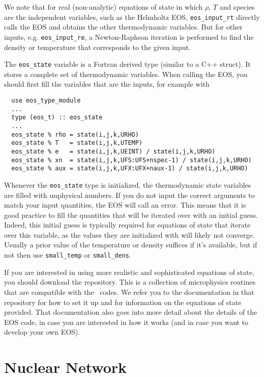We note that for real (non-analytic) equations of state
in which $\rho$, $T$ and species are the independent variables, such
as the Helmholtz EOS, {\tt eos\_input\_rt} directly calls the EOS
and obtains the other thermodynamic variables. But for other inputs,
e.g. {\tt eos\_input\_re}, a Newton-Raphson iteration is performed
to find the density or temperature that corresponds to the given
input.

The {\tt eos\_state} variable is a Fortran derived type (similar to
a C++ struct). It stores a complete set of thermodynamic
variables. When calling the EOS, you should first fill the variables
that are the inputs, for example with
\begin{verbatim}
  use eos_type_module
  ...
  type (eos_t) :: eos_state
  ...
  eos_state % rho = state(i,j,k,URHO)
  eos_state % T   = state(i,j,k,UTEMP)
  eos_state % e   = state(i,j,k,UEINT) / state(i,j,k,URHO)
  eos_state % xn  = state(i,j,k,UFS:UFS+nspec-1) / state(i,j,k,URHO)
  eos_state % aux = state(i,j,k,UFX:UFX+naux-1) / state(i,j,k,URHO)
\end{verbatim}
Whenever the \texttt{eos\_state} type is initialized, the
thermodynamic state variables are filled with unphysical numbers. If
you do not input the correct arguments to match your input quantities,
the EOS will call an error. This means that it is good
practice to fill the quantities that will be iterated over with an
initial guess. Indeed, this initial guess is typically required for
equations of state that iterate over this variable, as the values
they are initialized with will likely not
converge. Usually a prior value of the temperature or density suffices
if it's available, but if not then use \texttt{small\_temp} or
\texttt{small\_dens}.

If you are interested in using more realistic and sophisticated equations of
state, you should download the \href{https://github.com/BoxLib-Codes/Microphysics}{\microphysics}
repository. This is a collection of microphysics routines that are compatible with the
\boxlib\ codes. We refer you to the documentation in that repository for how to set it up
and for information on the equations of state provided. That documentation
also goes into more detail about the details of the EOS code, in case you are interested in
how it works (and in case you want to develop your own EOS).

\section{Nuclear Network}


